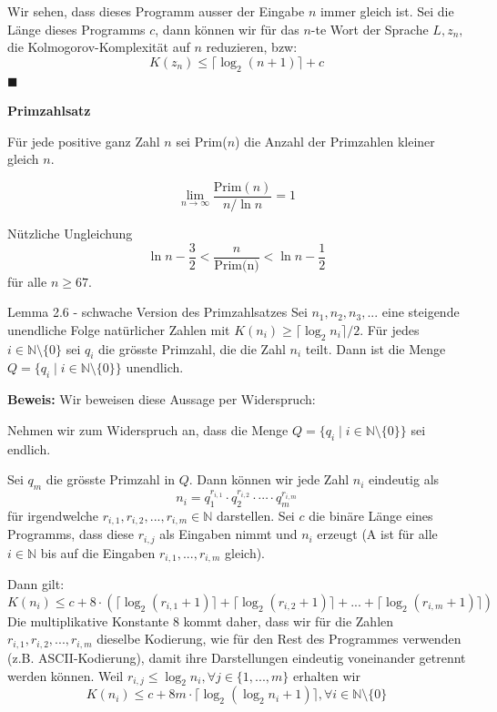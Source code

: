 \documentclass[a4paper, 11pt]{article}
\def\N{\mathbb{N}}
\begin{document}
        Wir sehen, dass dieses Programm ausser der Eingabe $n$ immer gleich ist. Sei die Länge dieses Programms $c$, dann können wir für das $n$-te Wort der Sprache $L, z_n,$ die Kolmogorov-Komplexität auf $n$ reduzieren, bzw:
        $$K(z_n) \leq \lceil \log_2(n+1)\rceil + c$$
        \hspace*{0pt}\hfill$\blacksquare$
    
    
    
        \textbf{Primzahlsatz}

        Für jede positive ganz Zahl $n$ sei Prim($n$) die Anzahl der Primzahlen kleiner gleich $n$. 
        \begin{mainbox}{}
            $$\lim_{n \to \infty}\frac{\text{Prim}(n)}{n/\ln n} = 1$$
        \end{mainbox}
        Nützliche Ungleichung
        $$\ln n - \frac{3}{2} < \frac{n}{\text{Prim(n)}} < \ln n - \frac{1}{2}$$
        für alle $n \geq 67$.
    
        \begin{mainbox}{Lemma 2.6 - schwache Version des Primzahlsatzes}
            Sei $n_1, n_2, n_3, ...$ eine steigende unendliche Folge natürlicher Zahlen mit $K(n_i) \geq \lceil \log_2 n_i \rceil / 2$. Für jedes $i \in \N \setminus \{0\}$ sei $q_i$ die grösste Primzahl, die die Zahl $n_i$ teilt. Dann ist die Menge $Q = \{q_i \mid i \in \N \setminus\{0\}\}$ unendlich.
        \end{mainbox}
        \textbf{Beweis: }
        Wir beweisen diese Aussage per Widerspruch:
    
        Nehmen wir zum Widerspruch an, dass die Menge $Q = \{q_i \mid i \in \N \setminus \{0\}\}$ sei endlich. 
        
        Sei $q_m$ die grösste Primzahl in $Q$. Dann können wir jede Zahl $n_i$ eindeutig als 
        $$n_i = q_1^{r_{i, 1}} \cdot q_2^{r_{i,2}} \cdot \cdots \cdot q_m^{r_{i,m}}$$
        für irgendwelche $r_{i,1}, r_{i,2}, ..., r_{i,m} \in \N$ darstellen. Sei $c$ die binäre Länge eines Programms, dass diese $r_{i,j}$ als Eingaben nimmt und $n_i$ erzeugt (A ist für alle $i\in \N$ bis auf die Eingaben $r_{i,1}, ..., r_{i,m}$ gleich).
        
        Dann gilt:
        $$K(n_i) \leq c + 8 \cdot (\lceil \log_2(r_{i,1}+1)\rceil + \lceil \log_2(r_{i,2}+1)\rceil + ... + \lceil \log_2(r_{i,m}+1)\rceil)$$
        Die multiplikative Konstante $8$ kommt daher, dass wir für die Zahlen $r_{i,1}, r_{i,2}, ..., r_{i,m}$ dieselbe Kodierung, wie für den Rest des Programmes verwenden (z.B. ASCII-Kodierung), damit ihre Darstellungen eindeutig voneinander getrennt werden können. Weil  $r_{i,j} \leq \log_2 n_i, \forall j \in \{1, ..., m\}$ erhalten wir 
        $$K(n_i) \leq c + 8m \cdot \lceil \log_2(\log_2 n_i + 1)\rceil, \forall i \in \N \setminus \{0\}$$
       
\end{document}
